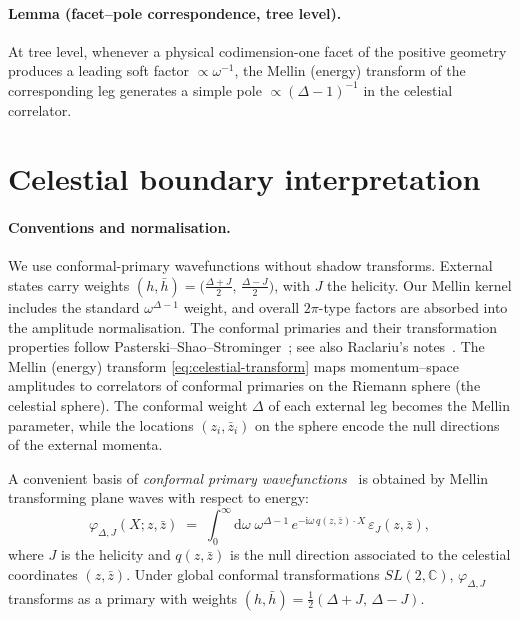 \documentclass[11pt]{article}
\begin{document}
\paragraph{Lemma (facet--pole correspondence, tree level).}
At tree level, whenever a physical codimension-one facet of the positive geometry produces a leading soft factor \(\propto \omega^{-1}\), the Mellin (energy) transform of the corresponding leg generates a simple pole \(\propto (\Delta-1)^{-1}\) in the celestial correlator.

\section{Celestial boundary interpretation}
\label{sec:celestial-interpretation}
\paragraph{Conventions and normalisation.}
We use conformal-primary wavefunctions without shadow transforms.
External states carry weights
\((h,\bar h)=\big(\tfrac{\Delta+J}{2},\,\tfrac{\Delta-J}{2}\big)\),
with \(J\) the helicity.
Our Mellin kernel includes the standard \(\omega^{\Delta-1}\) weight,
and overall \(2\pi\)-type factors are absorbed into the amplitude normalisation.
The conformal primaries and their transformation properties follow
Pasterski--Shao--Strominger~\cite{PasterskiShaoStrominger2017,PasterskiLectures2021};
see also Raclariu’s notes~\cite{RaclariuLectures2022}.
The Mellin (energy) transform \eqref{eq:celestial-transform} maps momentum--space amplitudes to correlators of conformal primaries on the Riemann sphere (the celestial sphere). The conformal weight \(\Delta\) of each external leg becomes the Mellin parameter, while the locations \((z_i,\bar z_i)\) on the sphere encode the null directions of the external momenta.

A convenient basis of \emph{conformal primary wavefunctions}~\cite{PasterskiShaoStrominger2017,Strominger2018,Raclariu2021} is obtained by Mellin transforming plane waves with respect to energy:
\begin{equation}
\varphi_{\Delta,J}(X;z,\bar z)
\;=\;
\int_{0}^{\infty}\!\mathrm{d}\omega\;\omega^{\Delta-1}\,
e^{-\mathrm{i}\omega\,q(z,\bar z)\cdot X}\, \varepsilon_J(z,\bar z),
\label{eq:primary-wf}
\end{equation}
where \(J\) is the helicity and \(q(z,\bar z)\) is the null direction associated to the celestial coordinates \((z,\bar z)\). Under global conformal transformations \(SL(2,\mathbb{C})\), \(\varphi_{\Delta,J}\) transforms as a primary with weights \((h,\bar h) = \tfrac{1}{2}(\Delta+J,\,\Delta-J)\).
\end{document}
